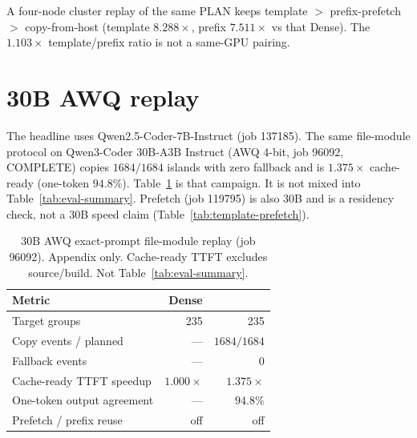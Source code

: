\begin{table}[t]
\centering
\small
\caption{Host-resident prefetch staircase on a copy of the seven-group
PLAN (same-GPU sequential arms). Lossy copy stays on. Prefix hints
rank above file islands; the class prior scores only the lossy pool.
Miss degrades to the owned copy ($3$ misses, $0$ fallback). Not
Table~\ref{tab:eval-summary}, not Table~\ref{tab:7b-dual-island}, and
not job 119795.}
\label{tab:prefetch-staircase}
\end{table}

A four-node cluster replay of the same PLAN keeps
template $>$ prefix-prefetch $>$ copy-from-host
(template $8.288\times$, prefix $7.511\times$ vs that Dense).
The $1.103\times$ template/prefix ratio is not a same-GPU pairing.

\section{30B AWQ replay}
\label{app:30b}

The headline uses Qwen2.5-Coder-7B-Instruct (job 137185). The same
file-module protocol on Qwen3-Coder 30B-A3B Instruct (AWQ 4-bit,
job 96092, COMPLETE) copies $1684/1684$ islands with zero fallback and
is $1.375\times$ cache-ready (one-token
$94.8\%$). Table~\ref{tab:eval-30b} is that campaign. It is not mixed
into Table~\ref{tab:eval-summary}. Prefetch (job 119795) is also 30B
and is a residency check, not a 30B speed claim
(Table~\ref{tab:template-prefetch}).

\begin{table}[t]
\centering
\small
\caption{30B AWQ exact-prompt file-module replay (job 96092). Appendix
only. Cache-ready TTFT excludes source/build. Not
Table~\ref{tab:eval-summary}.}
\label{tab:eval-30b}
\begin{tabular}{lrr}
\toprule
\textbf{Metric} & \textbf{Dense} & \textbf{\method{}} \\
\midrule
Target groups & 235 & 235 \\
Copy events / planned & --- & $1684/1684$ \\
Fallback events & --- & $0$ \\
Cache-ready TTFT speedup & $1.000\times$ & $1.375\times$ \\
One-token output agreement & --- & $94.8\%$ \\
Prefetch / prefix reuse & off & off \\
\bottomrule
\end{tabular}
\end{table}

